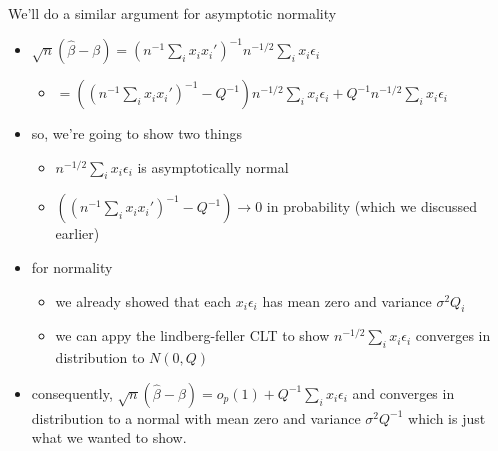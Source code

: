      We'll do a similar argument for asymptotic normality
\begin{itemize}
\item $\sqrt{n}(\hat\beta - \beta) = (n^{-1} \sum_i x_i x_i')^{-1}
       n^{-1/2} \sum_i x_i \epsilon_i$
\begin{itemize}
\item $= ((n^{-1} \sum_i x_i x_i')^{-1} - Q^{-1}) n^{-1/2} \sum_i
         x_i \epsilon_i + Q^{-1} n^{-1/2} \sum_i x_i \epsilon_i$
\end{itemize}
\item so, we're going to show two things
\begin{itemize}
\item $n^{-1/2} \sum_i x_i \epsilon_i$ is asymptotically normal
\item $((n^{-1} \sum_i x_i x_i')^{-1} - Q^{-1}) \to 0$ in
         probability (which we discussed earlier)
\end{itemize}
\item for normality
\begin{itemize}
\item we already showed that each $x_i \epsilon_i$ has mean zero and
         variance $\sigma^2 Q_i$
\item we can appy the lindberg-feller CLT to show $n^{-1/2} \sum_i
         x_i \epsilon_i$ converges in distribution to $N(0, Q)$
\end{itemize}
\item consequently, $\sqrt{n}(\hat\beta - \beta) = o_p(1) + Q^{-1}
       \sum_i x_i \epsilon_i$ and converges in distribution to a normal
       with mean zero and variance $\sigma^2 Q^{-1}$ which is just what
       we wanted to show.
\end{itemize}

